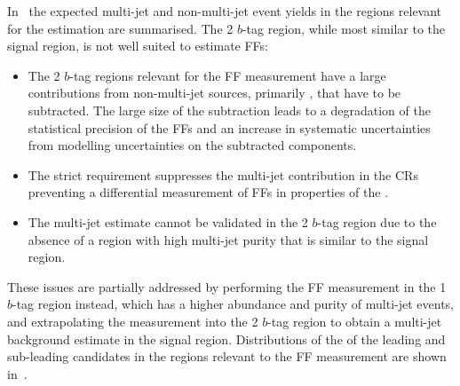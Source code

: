 In~ the expected multi-jet and non-multi-jet event
yields in the regions relevant for the \faketauhadvis estimation are
summarised. The 2 $b$-tag region, while most similar to the signal region, is
not well suited to estimate FFs:
\begin{itemize}

\item The 2 $b$-tag regions relevant for the FF measurement have a large
  contributions from non-multi-jet sources, primarily \ttbarFakes, that have to
  be subtracted. The large size of the subtraction leads to a degradation of the
  statistical precision of the FFs and an increase in systematic uncertainties
  from modelling uncertainties on the subtracted components.

\item The strict \btag requirement suppresses the multi-jet contribution in the
  CRs preventing a differential measurement of FFs in properties of the
  \tauhadvis.

\item The multi-jet estimate cannot be validated in the 2 $b$-tag region due to
  the absence of a region with high multi-jet purity that is similar to the
  signal region.

\end{itemize}
These issues are partially addressed by performing the FF measurement in the 1
$b$-tag region instead, which has a higher abundance and purity of multi-jet
events, and extrapolating the measurement into the 2 $b$-tag region to obtain a
multi-jet background estimate in the signal region. Distributions of the \pT of
the leading and sub-leading \tauhadvis candidates in the regions relevant to the
FF measurement are shown in~.


